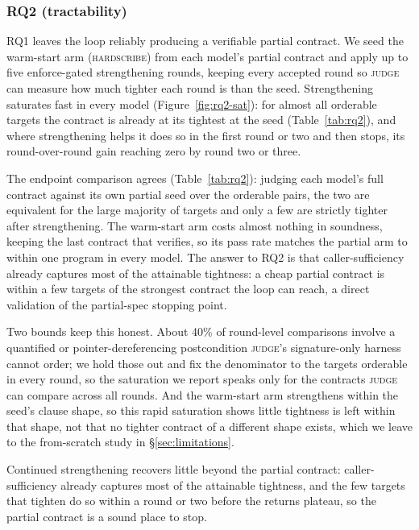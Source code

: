 \documentclass[conference]{IEEEtran}
\theoremstyle{definition}
\theoremstyle{remark}
\begin{document}
\subsubsection{RQ2 (tractability)}

RQ1 leaves the loop reliably producing a verifiable partial contract. We
seed the warm-start arm (\textsc{hardscribe}) from each model's partial
contract and apply up to five enforce-gated strengthening rounds, keeping
every accepted round so \textsc{judge} can measure how much tighter each
round is than the seed. Strengthening saturates fast in every model
(Figure~\ref{fig:rq2-sat}): for almost all orderable targets the contract is
already at its tightest at the seed (Table~\ref{tab:rq2}), and where
strengthening helps it does so in the first round or two and then stops, its
round-over-round gain reaching zero by round two or three.

The endpoint comparison agrees (Table~\ref{tab:rq2}): judging each model's
full contract against its own partial seed over the orderable pairs, the two
are equivalent for the large majority of targets and only a few are strictly
tighter after strengthening. The warm-start arm costs almost nothing in
soundness, keeping the last contract that verifies, so its pass rate matches
the partial arm to within one program in every model. The answer to RQ2 is
that caller-sufficiency already captures most of the attainable tightness: a
cheap partial contract is within a few targets of the strongest contract the
loop can reach, a direct validation of the partial-spec stopping point.

Two bounds keep this honest. About 40\% of round-level comparisons involve a
quantified or pointer-dereferencing postcondition \textsc{judge}'s
signature-only harness cannot order; we hold those out and fix the denominator
to the targets orderable in every round, so the saturation we report speaks
only for the contracts \textsc{judge} can compare across all rounds. And
the warm-start arm strengthens within the seed's clause shape, so this rapid
saturation shows little tightness is left within that shape, not that no tighter
contract of a different shape exists, which we leave to the from-scratch
study in \S\ref{sec:limitations}.

\begin{tcolorbox}[mybox,title=RQ2 Answer]
  Continued strengthening recovers little beyond the partial contract:
  caller-sufficiency already captures most of the attainable tightness, and
  the few targets that tighten do so within a round or two before the returns
  plateau, so the partial contract is a sound place to stop.
\end{tcolorbox}
\end{document}
